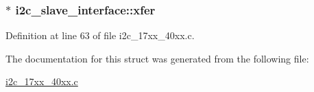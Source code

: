 \subsubsection[{\texorpdfstring{xfer}{xfer}}]{$\ast$ i2c\+\_\+slave\+\_\+interface\+::xfer}\hypertarget{structi2c__slave__interface_a934caaab567fddcae9ebec6358047275}{}\label{structi2c__slave__interface_a934caaab567fddcae9ebec6358047275}


Definition at line 63 of file i2c\+\_\+17xx\+\_\+40xx.\+c.



The documentation for this struct was generated from the following file\+:\begin{DoxyCompactItemize}
\item 
\hyperlink{i2c__17xx__40xx_8c}{i2c\+\_\+17xx\+\_\+40xx.\+c}\end{DoxyCompactItemize}
